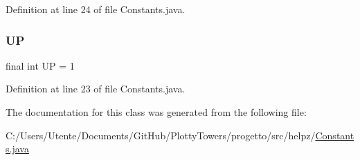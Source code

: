 Definition at line 24 of file Constants.\+java.

\mbox{\label{classhelpz_1_1_constants_1_1_direction_ad6535a3a47426014d15edf19175a7293}} 
\subsubsection{\texorpdfstring{UP}{UP}}
{\footnotesize\ttfamily final int UP = 1\hspace{0.3cm}{\ttfamily [static]}}



Definition at line 23 of file Constants.\+java.



The documentation for this class was generated from the following file\+:\begin{DoxyCompactItemize}
\item 
C\+:/\+Users/\+Utente/\+Documents/\+Git\+Hub/\+Plotty\+Towers/progetto/src/helpz/\hyperlink{_constants_8java}{Constants.\+java}\end{DoxyCompactItemize}

